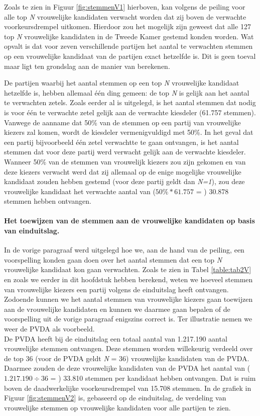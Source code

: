 Zoals te zien in Figuur \ref{fig:stemmenV1} hierboven, kan volgens de peiling voor alle top \textit{N} vrouwelijke kandidaten verwacht worden dat zij boven de verwachte voorkeursdrempel uitkomen. Hierdoor zou het mogelijk zijn geweest dat alle 127 top \textit{N} vrouwelijke kandidaten in de Tweede Kamer gestemd konden worden. Wat opvalt is dat voor zeven verschillende partijen het aantal te verwachten stemmen op een vrouwelijke kandidaat van de partijen exact hetzelfde is. Dit is geen toeval maar ligt ten grondslag aan de manier van berekenen.

De partijen waarbij het aantal stemmen op een top \textit{N} vrouwelijke kandidaat hetzelfde is, hebben allemaal één ding gemeen: de top \textit{N} is gelijk aan het aantal te verwachten zetels. Zoals eerder al is uitgelegd, is het aantal stemmen dat nodig is voor één te verwachte zetel gelijk aan de verwachte kiesdeler (61.757 stemmen). Vanwege de aanname dat 50\% van de stemmen op een partij van vrouwelijke kiezers zal komen, wordt de kiesdeler vermenigvuldigd met 50\%. In het geval dat een partij bijvoorbeeld één zetel verwachtte te gaan ontvangen, is het aantal stemmen dat voor deze partij werd verwacht gelijk aan de verwachte kiesdeler. Wanneer 50\% van de stemmen van vrouwelijk kiezers zou zijn gekomen en van deze kiezers verwacht werd dat zij allemaal op de enige mogelijke vrouwelijke kandidaat zouden hebben gestemd (voor deze partij geldt dan \textit{N=1}), zou deze vrouwelijke kandidaat het verwachte aantal van ($50\%*61.757$ = ) 30.878 stemmen hebben ontvangen. 


\paragraph{Het toewijzen van de stemmen aan de vrouwelijke kandidaten op basis van einduitslag.}
In de vorige paragraaf werd uitgelegd hoe we, aan de hand van de peiling, een voorspelling konden gaan doen over het aantal stemmen dat een top \textit{N} vrouwelijke kandidaat kon gaan verwachten. Zoals te zien in Tabel \ref{table:tab2V} en zoals we eerder in dit hoofdstuk hebben berekend, weten we hoeveel stemmen van vrouwelijke kiezers een partij volgens de einduitslag heeft ontvangen. Zodoende kunnen we het aantal stemmen van vrouwelijke kiezers gaan toewijzen aan de vrouwelijke kandidaten en kunnen we daarmee gaan bepalen of de voorspelling uit de vorige paragraaf enigszins correct is. Ter illustratie nemen we weer de PVDA als voorbeeld. \\
\indent De PVDA heeft bij de einduitslag een totaal aantal van 1.217.190 aantal vrouwelijke stemmen ontvangen. Deze stemmen worden willekeurig verdeeld over de top 36 (voor de PVDA geldt \textit{N} = 36) vrouwelijke kandidaten van de PVDA. Daarmee zouden de deze vrouwelijke kandidaten van de PVDA het aantal van ($1.217.190\div36$ = ) 33.810 stemmen per kandidaat hebben ontvangen. Dat is ruim boven de daadwerkelijke voorkeursdrempel van 15.708 stemmen. In de grafiek in Figuur \ref{fig:stemmenV2} is, gebaseerd op de einduitslag, de verdeling van vrouwelijke stemmen op vrouwelijke kandidaten voor alle partijen te zien.

